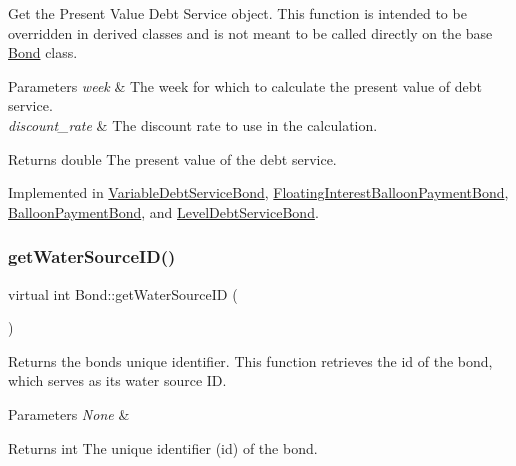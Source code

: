 Get the Present Value Debt Service object. This function is intended to be overridden in derived classes and is not meant to be called directly on the base {\ttfamily \mbox{\hyperlink{classBond}{Bond}}} class. 


\begin{DoxyParams}{Parameters}
{\em week} & The week for which to calculate the present value of debt service. \\
\hline
{\em discount\+\_\+rate} & The discount rate to use in the calculation. \\
\hline
\end{DoxyParams}
\begin{DoxyReturn}{Returns}
double The present value of the debt service. 
\end{DoxyReturn}


Implemented in \mbox{\hyperlink{classVariableDebtServiceBond_aa5ad4fcc7c65154105388b332ae98198}{Variable\+Debt\+Service\+Bond}}, \mbox{\hyperlink{classFloatingInterestBalloonPaymentBond_a91b2fef92f90049a3ba13bcd27c0eff2}{Floating\+Interest\+Balloon\+Payment\+Bond}}, \mbox{\hyperlink{classBalloonPaymentBond_ae038863f7a3408c2c8cd503d8e789f2d}{Balloon\+Payment\+Bond}}, and \mbox{\hyperlink{classLevelDebtServiceBond_a37801ecfc13ae1b6e05b4330398a7582}{Level\+Debt\+Service\+Bond}}.

\mbox{\label{classBond_a8190ab6482e6a9481afca4840147527e}} 
\subsubsection{\texorpdfstring{get\+Water\+Source\+I\+D()}{getWaterSourceID()}}
{\footnotesize\ttfamily virtual int Bond\+::get\+Water\+Source\+ID (\begin{DoxyParamCaption}{ }\end{DoxyParamCaption})\hspace{0.3cm}{\ttfamily [virtual]}}



Returns the bond\textquotesingle{}s unique identifier. This function retrieves the {\ttfamily id} of the bond, which serves as its water source ID. 


\begin{DoxyParams}{Parameters}
{\em None} & \\
\hline
\end{DoxyParams}
\begin{DoxyReturn}{Returns}
int The unique identifier ({\ttfamily id}) of the bond. 
\end{DoxyReturn}


